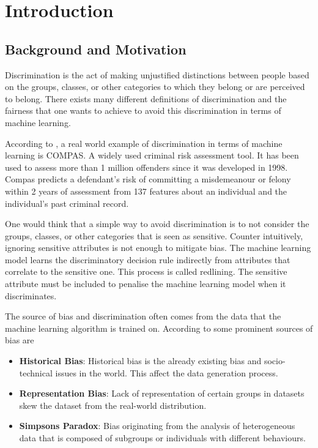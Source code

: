
\chapter{Introduction}
\label{ch:intro}


\section{Background and Motivation}
\label{sec:intro:background}
Discrimination is the act of making unjustified distinctions between people based on the groups, classes, or other categories to which they belong or are perceived to belong. There exists many different definitions of discrimination \cite{Altman:2011:doc} and the fairness that one wants to achieve to avoid this discrimination in terms of machine learning. \cite{Binns:2018:PMLR}

According to \citet{Dressel:2018:AAAS}, a real world example of discrimination in terms of machine learning is COMPAS. A widely used criminal risk assessment tool. It has been used to assess more than 1 million offenders since it was developed in 1998. Compas predicts a defendant’s risk of committing a misdemeanour or felony within 2 years of assessment from 137 features about an individual and the individual’s past criminal record.

One would think that a simple way to avoid discrimination is to not consider the groups, classes, or other categories that is seen as sensitive. Counter intuitively, ignoring sensitive attributes is not enough to mitigate bias. The machine learning model learns the discriminatory decision rule indirectly from attributes that correlate to the sensitive one. \cite{Dressel:2018:AAAS, Calders:20210:DMKD} This process is called redlining. The sensitive attribute must be included to penalise the machine learning model when it discriminates.

The source of bias and discrimination often comes from the data that the machine learning algorithm is trained on. According to \citet{Mehrabi:2021:CSUR} some prominent sources of bias are

\begin{itemize}
    \item \textbf{Historical Bias}: Historical bias is the already existing bias and socio-technical issues in the world. This affect the data generation process.
    \item \textbf{Representation Bias}: Lack of representation of certain groups in datasets skew the dataset from the real-world distribution.
    \item \textbf{Simpsons Paradox}: Bias originating from the analysis of heterogeneous data that is composed of subgroups or individuals with different behaviours.
\end{itemize}

